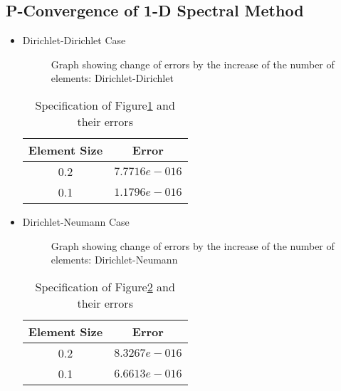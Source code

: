 \subsection {P-Convergence of 1-D Spectral Method}



\begin{itemize}

\item Dirichlet-Dirichlet Case
\begin{figure}[h]
\begin{center}
\caption{\label{sinDDpconv}Graph showing change of errors by the
increase of the number of elements: Dirichlet-Dirichlet}
\end{center}
\end{figure}

\begin{table}[h]
\centering \caption{\label{pconv1t} Specification of
                              Figure\ref{sinDDpconv} and their errors}
\begin{tabular}{|c|c|} \hline
Element Size&Error   \\ \hline \hline
    0.2&$7.7716e-016$  \\ \hline
    0.1&$1.1796e-016$  \\ \hline
\end{tabular}
\end{table}

\item Dirichlet-Neumann Case


\begin{figure}[h]
\begin{center}
\caption{\label{sinDNpconv}Graph showing change of errors by the
increase of the number of elements: Dirichlet-Neumann}
\end{center}
\end{figure}

\begin{table}[h]
\centering \caption{\label{pconv2t} Specification of
                              Figure\ref{sinDNpconv} and their errors}
\begin{tabular}{|c|c|} \hline
Element Size&Error   \\ \hline \hline
    0.2&$8.3267e-016$  \\ \hline
    0.1&$6.6613e-016$  \\ \hline
\end{tabular}
\end{table}


\end{itemize}
